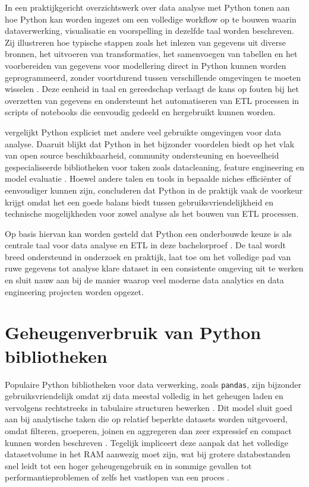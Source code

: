 In een praktijkgericht overzichtswerk over data analyse met Python tonen \textcite{Wei2025} aan hoe Python kan worden ingezet om een volledige workflow op te bouwen waarin dataverwerking, visualisatie en voorspelling in dezelfde taal worden beschreven. Zij illustreren hoe typische stappen zoals het inlezen van gegevens uit diverse bronnen, het uitvoeren van transformaties, het samenvoegen van tabellen en het voorbereiden van gegevens voor modellering direct in Python kunnen worden geprogrammeerd, zonder voortdurend tussen verschillende omgevingen te moeten wisselen \autocite{Wei2025}. Deze eenheid in taal en gereedschap verlaagt de kans op fouten bij het overzetten van gegevens en ondersteunt het automatiseren van ETL processen in scripts of notebooks die eenvoudig gedeeld en hergebruikt kunnen worden.

\textcite{Sharma2020} vergelijkt Python expliciet met andere veel gebruikte omgevingen voor data analyse. Daaruit blijkt dat Python in het bijzonder voordelen biedt op het vlak van open source beschikbaarheid, community ondersteuning en hoeveelheid gespecialiseerde bibliotheken voor taken zoals datacleaning, feature engineering en model evaluatie \autocite{Sharma2020}. Hoewel andere talen en tools in bepaalde niches efficiënter of eenvoudiger kunnen zijn, concluderen \textcite{Sharma2020} dat Python in de praktijk vaak de voorkeur krijgt omdat het een goede balans biedt tussen gebruiksvriendelijkheid en technische mogelijkheden voor zowel analyse als het bouwen van ETL processen.

Op basis hiervan kan worden gesteld dat Python een onderbouwde keuze is als centrale taal voor data analyse en ETL in deze bachelorproef \autocite{Kabir2024,Sharma2020}. De taal wordt breed ondersteund in onderzoek en praktijk, laat toe om het volledige pad van ruwe gegevens tot analyse klare dataset in een consistente omgeving uit te werken en sluit nauw aan bij de manier waarop veel moderne data analytics en data engineering projecten worden opgezet.

\section{Geheugenverbruik van Python bibliotheken}
\label{sec:geheugenverbruik-python-bibliotheken}

Populaire Python bibliotheken voor data verwerking, zoals \texttt{pandas}, zijn bijzonder gebruiksvriendelijk omdat zij data meestal volledig in het geheugen laden en vervolgens rechtstreeks in tabulaire structuren bewerken \autocite{Breddels2018,Petersohn2020}. Dit model sluit goed aan bij analytische taken die op relatief beperkte datasets worden uitgevoerd, omdat filteren, groeperen, joinen en aggregeren dan zeer expressief en compact kunnen worden beschreven \autocite{Breddels2018}. Tegelijk impliceert deze aanpak dat het volledige datasetvolume in het RAM aanwezig moet zijn, wat bij grotere databestanden snel leidt tot een hoger geheugengebruik en in sommige gevallen tot performantieproblemen of zelfs het vastlopen van een proces \autocite{Breddels2018,Mekouar2025}.


